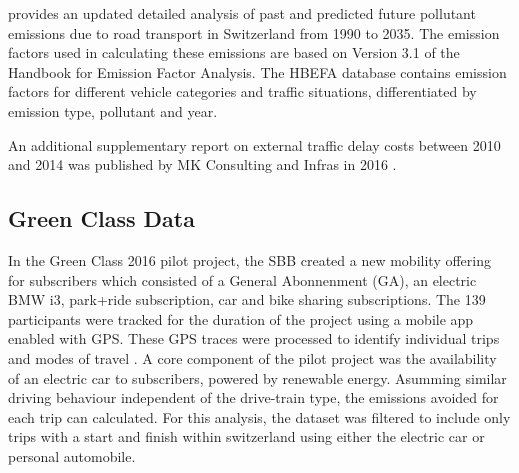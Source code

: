 \cite{foen2010pollutants} provides an updated detailed analysis of past and predicted future pollutant emissions due to road transport in Switzerland from 1990 to 2035.
The emission factors used in calculating these emissions are based on Version 3.1 of the Handbook for Emission Factor Analysis.
The HBEFA database contains emission factors for different vehicle categories and traffic situations, differentiated by emission type, pollutant and year.

An additional supplementary report on external traffic delay costs between 2010 and 2014 was published by MK Consulting and Infras in 2016 \cite{}.

\subsection{Green Class Data}
In the Green Class 2016 pilot project, the SBB created a new mobility offering for subscribers which consisted of a General Abonnenment (GA), an electric BMW i3, park+ride subscription, car and bike sharing subscriptions.
The 139 participants were tracked for the duration of the project using a mobile app enabled with GPS.
 These GPS traces were processed to identify individual trips and modes of travel \cite{rabaul2016greenclassprocessing}.
A core component of the pilot project was the availability of an electric car to subscribers, powered by renewable energy.
Asumming similar driving behaviour independent of the drive-train type, the emissions avoided for each trip can calculated.
For this analysis, the dataset was filtered to include only trips with a start and finish within switzerland using either the electric car or personal automobile. 